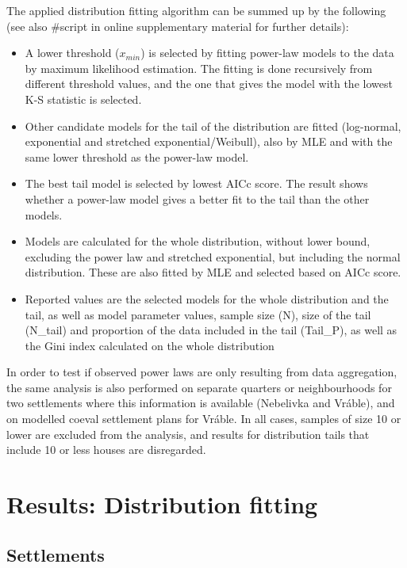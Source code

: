 \documentclass[
  12pt,
]{book}
\begin{document}
The applied distribution fitting algorithm can be summed up by the following (see also \#script in online supplementary material for further details):

\begin{itemize}
\item
  A lower threshold (\(x_{min}\)) is selected by fitting power-law models to the data by maximum likelihood estimation. The fitting is done recursively from different threshold values, and the one that gives the model with the lowest K-S statistic is selected.
\item
  Other candidate models for the tail of the distribution are fitted (log-normal, exponential and stretched exponential/Weibull), also by MLE and with the same lower threshold as the power-law model.
\item
  The best tail model is selected by lowest AICc score. The result shows whether a power-law model gives a better fit to the tail than the other models.
\item
  Models are calculated for the whole distribution, without lower bound, excluding the power law and stretched exponential, but including the normal distribution. These are also fitted by MLE and selected based on AICc score.
\item
  Reported values are the selected models for the whole distribution and the tail, as well as model parameter values, sample size (N), size of the tail (N\_tail) and proportion of the data included in the tail (Tail\_P), as well as the Gini index calculated on the whole distribution
\end{itemize}

In order to test if observed power laws are only resulting from data aggregation, the same analysis is also performed on separate quarters or neighbourhoods for two settlements where this information is available (Nebelivka and Vráble), and on modelled coeval settlement plans for Vráble. In all cases, samples of size 10 or lower are excluded from the analysis, and results for distribution tails that include 10 or less houses are disregarded.

\hypertarget{results-distfit}{%
\chapter{Results: Distribution fitting}\label{results-distfit}}

\hypertarget{settlements}{%
\section{Settlements}\label{settlements}}
\end{document}
